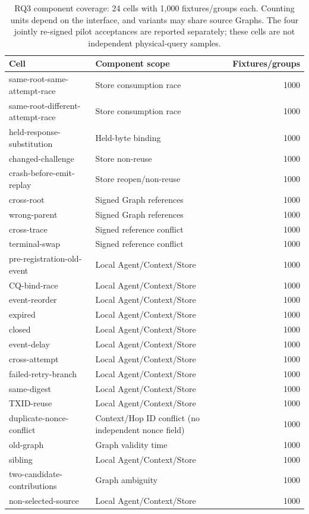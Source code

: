 \begin{table}[t]
\centering\small
\setlength{\tabcolsep}{3.5pt}
\caption{RQ3 component coverage: 24 cells with 1,000 fixtures/groups each. Counting units depend on the interface, and variants may share source Graphs. The four jointly re-signed pilot acceptances are reported separately; these cells are not independent physical-query samples.}
\label{tab:rq3-components}
\begin{tabularx}{\textwidth}{@{}X X r@{}}
\toprule
Cell & Component scope & Fixtures/groups \\
\midrule
same-root-same-attempt-race & Store consumption race & 1000 \\
same-root-different-attempt-race & Store consumption race & 1000 \\
held-response-substitution & Held-byte binding & 1000 \\
changed-challenge & Store non-reuse & 1000 \\
crash-before-emit-replay & Store reopen/non-reuse & 1000 \\
cross-root & Signed Graph references & 1000 \\
wrong-parent & Signed Graph references & 1000 \\
cross-trace & Signed reference conflict & 1000 \\
terminal-swap & Signed reference conflict & 1000 \\
pre-registration-old-event & Local Agent/Context/Store & 1000 \\
CQ-bind-race & Local Agent/Context/Store & 1000 \\
event-reorder & Local Agent/Context/Store & 1000 \\
expired & Local Agent/Context/Store & 1000 \\
closed & Local Agent/Context/Store & 1000 \\
event-delay & Local Agent/Context/Store & 1000 \\
cross-attempt & Local Agent/Context/Store & 1000 \\
failed-retry-branch & Local Agent/Context/Store & 1000 \\
same-digest & Local Agent/Context/Store & 1000 \\
TXID-reuse & Local Agent/Context/Store & 1000 \\
duplicate-nonce-conflict & Context/Hop ID conflict (no independent nonce field) & 1000 \\
old-graph & Graph validity time & 1000 \\
sibling & Local Agent/Context/Store & 1000 \\
two-candidate-contributions & Graph ambiguity & 1000 \\
non-selected-source & Local Agent/Context/Store & 1000 \\
\bottomrule
\end{tabularx}
\end{table}
